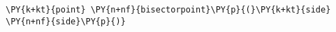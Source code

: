 \begin{Verbatim}[commandchars=\\\{\}]
    \PY{k+kt}{point} \PY{n+nf}{bisectorpoint}\PY{p}{(}\PY{k+kt}{side} \PY{n+nf}{side}\PY{p}{)}
\end{Verbatim}
